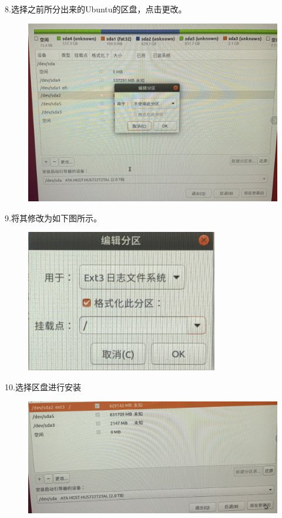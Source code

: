 \documentclass[openbib]{article}
\begin{document}
8.选择之前所分出来的Ubuntu的区盘，点击更改。
\begin{figure}[H]
	\centering
	\includegraphics[scale=0.3]{34}
\end{figure}

9.将其修改为如下图所示。
\begin{figure}[H]
	\centering
	\includegraphics[scale=0.3]{35}
\end{figure}

10.选择区盘进行安装
\begin{figure}[H]
	\centering
	\includegraphics[scale=0.3]{36}
\end{figure}
\end{document}
